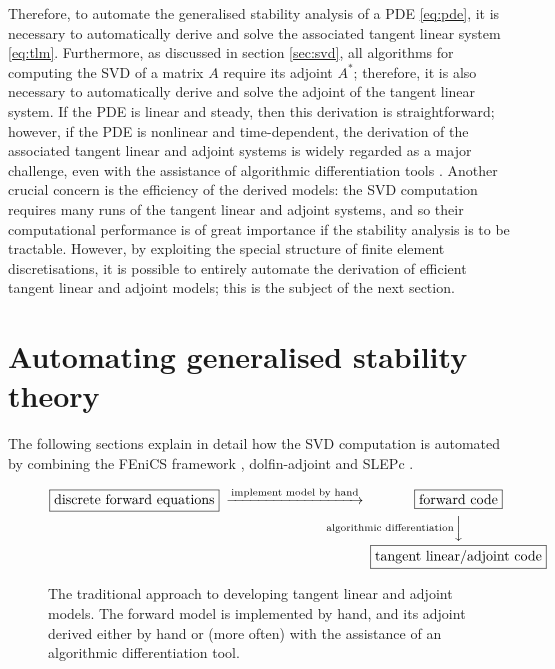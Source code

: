 \documentclass{siamltex}
\begin{document}
Therefore, to automate the generalised stability analysis of a PDE \eqref{eq:pde}, it is necessary to automatically derive and solve
the associated tangent linear system \eqref{eq:tlm}. Furthermore, as discussed in section \ref{sec:svd}, all algorithms for computing
the SVD of a matrix $A$ require its adjoint $A^*$; therefore, it is also necessary to automatically derive and solve the adjoint
of the tangent linear system. If the PDE is linear and steady, then this derivation is straightforward; however, if the PDE
is nonlinear and time-dependent, the derivation of the associated tangent linear and adjoint systems is widely regarded as a major
challenge, even with the assistance of algorithmic differentiation tools \cite{naumann2011}. Another crucial concern is the efficiency
of the derived models: the SVD computation requires many runs of the tangent linear and adjoint systems, and so their computational
performance is of great importance if the stability analysis is to be tractable. However, by exploiting the special structure of
finite element discretisations, it is possible to entirely automate the derivation of efficient tangent linear and adjoint models; this
is the subject of the next section.

\section{Automating generalised stability theory} \label{sec:automation}
The following sections explain in detail how the SVD computation is automated by combining the FEniCS framework \cite{logg2011}, dolfin-adjoint and SLEPc \cite{hernandez2005,hernandez2007b}.

\begin{figure}
\begin{equation*}
  \begin{CD}
    \fbox{\textrm{discrete forward equations}}
    @>\textrm{implement model by hand}>>
    \fbox{\textrm{forward code}}\\
    @.
    @V\textrm{algorithmic differentiation}VV \\
    @.
    \fbox{\textrm{tangent linear/adjoint code}}\\
  \end{CD}
\end{equation*}
  \caption{The traditional approach to developing tangent linear and adjoint models. The forward model
  is implemented by hand, and its adjoint derived either by hand or (more often) with the assistance
  of an algorithmic differentiation tool.}
  \label{fig:traditional_approach}
\end{figure}
\end{document}
